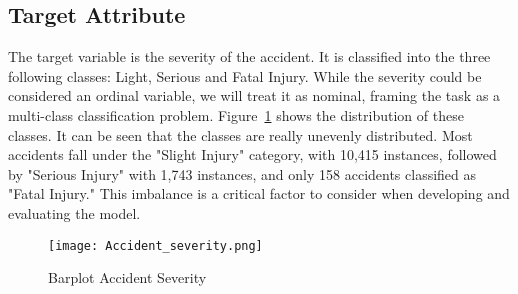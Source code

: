 \documentclass{article}
\begin{document}
\subsection{Target Attribute}

The target variable is the severity of the accident. It is classified into the three following classes: Light, Serious and Fatal Injury. While the severity could be considered an ordinal variable, we will treat it as nominal, framing the task as a multi-class classification problem. Figure~\ref{fig:hist:price} shows the distribution of these classes. It can be seen that the classes are really unevenly distributed. Most accidents fall under the "Slight Injury" category, with 10,415 instances, followed by "Serious Injury" with 1,743 instances, and only 158 accidents classified as "Fatal Injury." This imbalance is a critical factor to consider when developing and evaluating the model.

\begin{figure}[H]
\centering
\texttt{[image: Accident\_severity.png]}
\caption{\label{fig:hist:price}Barplot Accident Severity}
\end{figure}
\end{document}
